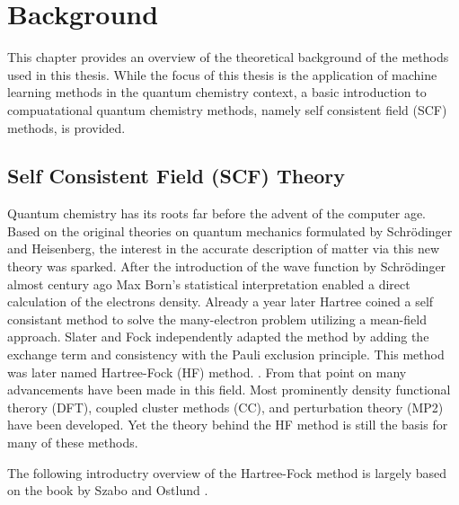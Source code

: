 \chapter{Background}
\label{sec:background}
This chapter provides an overview of the theoretical background of the methods used in this thesis. While the focus of this thesis is the application of machine learning methods in the quantum chemistry context, a basic introduction to compuatational quantum chemistry methods, namely self consistent field (SCF) methods, is provided. 

\section{Self Consistent Field (SCF) Theory}
\label{sec:background_scf}
Quantum chemistry has its roots far before the advent of the computer age. Based on the original theories on quantum mechanics formulated by Schrödinger and Heisenberg, the interest in the accurate description of matter via this new theory was sparked. After the introduction of the wave function by Schrödinger almost century ago Max Born's statistical interpretation enabled a direct calculation of the electrons density. \parencite{ref:schroedinger_1926undulatory} Already a year later Hartree coined a self consistant method to solve the many-electron problem utilizing a mean-field approach. Slater and Fock independently adapted the method by adding the exchange term and consistency with the Pauli exclusion principle. This method was later named Hartree-Fock (HF) method. \parencite{ref:Hartree_1928,ref:slater1930note,ref:fock1930naherungsmethode}. From that point on many advancements have been made in this field. Most prominently density functional therory (DFT), coupled cluster methods (CC), and perturbation theory (MP2) have been developed. Yet the theory behind the HF method is still the basis for many of these methods.

The following introductry overview of the Hartree-Fock method is largely based on the book by Szabo and Ostlund \parencite{ref:szabo_ostlund}. 

